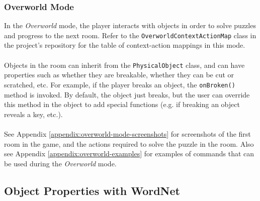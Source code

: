 \documentclass[11pt]{article}
\begin{document}
\subsubsection{Overworld Mode}

In the \textit{Overworld} mode, the player interacts with objects in order to solve puzzles and progress to the next room. Refer to the  \texttt{OverworldContextActionMap} class in the project's repository for the table of context-action mappings in this mode.
\\
\\
Objects in the room can inherit from the \texttt{PhysicalObject} class, and can have properties such as whether they are breakable, whether they can be cut or scratched, etc. For example, if the player breaks an object, the \texttt{onBroken()} method is invoked. By default, the object just breaks, but the user can override this method in the object to add special functions (e.g. if breaking an object reveals a key, etc.).
\\
\\
See Appendix \ref{appendix:overworld-mode-screenshots} for screenshots of the first room in the game, and the actions required to solve the puzzle in the room. Also see Appendix \ref{appendix:overworld-examples} for examples of commands that can be used during the \textit{Overworld} mode. 

\subsection{Object Properties with WordNet}
\end{document}
